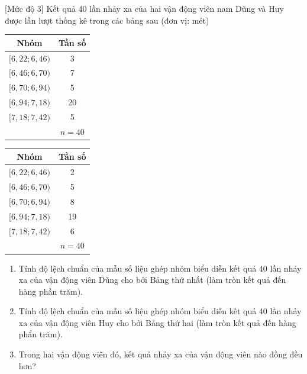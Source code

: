 \begin{bt}%
[Mức độ 3]%
	Kết quả 40 lần nhảy xa của hai vận động viên nam Dũng và Huy được lần lượt thống kê trong các bảng sau (đơn vị: mét)
	\begin{center}
		\begin{tabular}{|c|c|}
			\hline Nhóm & Tần số \\
			\hline$[6,22 ; 6,46)$ & 3 \\
			{$[6,46 ; 6,70)$} & 7 \\
			{$[6,70 ; 6,94)$} & 5 \\
			{$[6,94 ; 7,18)$} & 20 \\
			{$[7,18 ; 7,42)$} & 5 \\
			\hline & $n=40$ \\
			\hline
		\end{tabular}
		\begin{tabular}{|c|c|}
			\hline Nhóm & Tần số \\
			\hline$[6,22 ; 6,46)$ & 2 \\
			{$[6,46 ; 6,70)$} & 5 \\
			{$[6,70 ; 6,94)$} & 8 \\
			{$[6,94 ; 7,18)$} & 19 \\
			{$[7,18 ; 7,42)$} & 6 \\
			\hline & $n=40$ \\
			\hline
		\end{tabular}
	\end{center}
	\begin{enumerate}
		\item  Tính độ lệch chuẩn của mẫu số liệu ghép nhóm biểu diễn kết quả 40 lần nhảy xa của vận động viên Dũng cho bởi Bảng thứ nhất (làm tròn kết quả đến hàng phần trăm).
		\item Tính độ lệch chuẩn của mẫu số liệu ghép nhóm biểu diễn kết quả 40 lần nhảy xa của vận động viên Huy cho bởi Bảng thứ hai (làm tròn kết quả đến hàng phẩn trăm).
		\item Trong hai vận động viên đó, kết quả nhảy xa của vận động viên nào đồng đều hơn?
	\end{enumerate}
\end{bt}

